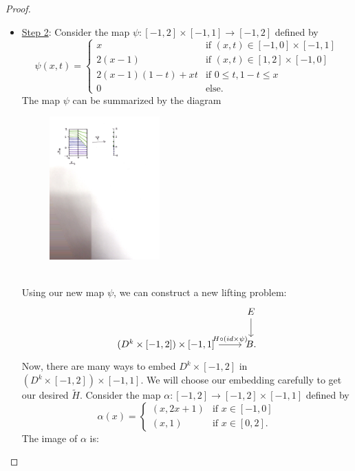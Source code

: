 \documentclass{article}
\newtheorem{proposed work}[theorem]{Proposed Work}
\begin{document}
\begin{proof}
\begin{itemize}
\item \underline{Step 2}: Consider the map $\psi: [-1,2] \times [-1,1] \to [-1,2]$ defined by
\begin{equation*}
\psi(x,t) = \begin{cases}
x & \text{if } (x,t) \in [-1,0] \times [-1,1] \\
2(x-1) & \text{if } (x,t) \in [1,2] \times [-1,0] \\
2(x-1)(1-t) + xt & \text{if } 0 \leq t, 1-t \leq x \\
0 & \text{else}.
\end{cases}
\end{equation*}
The map $\psi$ can be summarized by the diagram
\begin{figure}[h]
\centering
\includegraphics[width=0.4\textwidth]{psipic}
\end{figure}\\
Using our new map $\psi$, we can construct a new lifting problem:
\begin{equation*}
\begin{tikzcd}
& E \arrow[d] \\
(D^k \times [-1,2]) \times [-1,1] \arrow[r,"H \circ (id \times \psi)"] & B.
\end{tikzcd}
\end{equation*}
Now, there are many ways to embed $D^k \times [-1,2]$ in $(D^k \times [-1,2]) \times [-1,1]$. We will choose our embedding carefully to get our desired $\widetilde{H}$. Consider the map $\alpha: [-1,2] \to [-1,2] \times [-1,1]$ defined by 
\begin{equation*}
\alpha(x) = \begin{cases}
(x, 2x+1) & \text{if } x \in [-1,0] \\
(x,1) & \text{if } x \in [0,2].
\end{cases}
\end{equation*}
The image of $\alpha$ is:

\end{itemize}
\end{proof}
\end{document}
